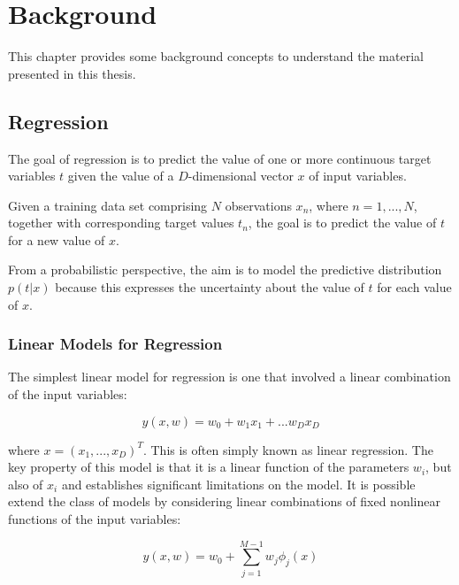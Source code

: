 \chapter{Background}
\label{chap:background}
This chapter provides some background concepts to understand the material 
presented in this thesis. 


\section{Regression}
The goal of regression is to predict the value of one or more continuous target variables $t$ given the value of a $D$-dimensional vector $x$ of input variables. \cite[]{bishop:2006:PRML}

\noindent Given a training data set comprising $N$ observations ${x_n}$, where $n = 1,...,N$,
together with corresponding target values ${t_n}$, the goal is to predict the value of $t$
for a new value of $x$.

\noindent From a probabilistic perspective, the aim is to model the predictive distribution $p(t|x)$ because this expresses the uncertainty about the value of $t$ for each value of $x$.

\subsection{Linear Models for Regression}
\label{subsec:reglinuniv}

The simplest linear model for regression is one that involved a linear combination of the input variables:
\begin{Equation}[H]
	\centering
	\begin{equation} \label{eq:lincomb}
		y(x,w)=w_0 + w_1x_1+...w_D x_D
	\end{equation}
\end{Equation}

\noindent where $x=(x_1,...,x_D)^T$. This is often simply known as linear regression. The key property of this model is that it is a linear function of the parameters $w_i$, but also of $x_i$ and establishes significant limitations on the model. It is possible extend the class of models by considering linear combinations of fixed nonlinear functions of the input variables:
\begin{Equation}[H]
	\centering
	\begin{equation} \label{eq:lincombbasis}
		y(x,w)=w_0 + \sum_{j=1}^{M-1}w_j \phi_j(x)
	\end{equation}
\end{Equation}

